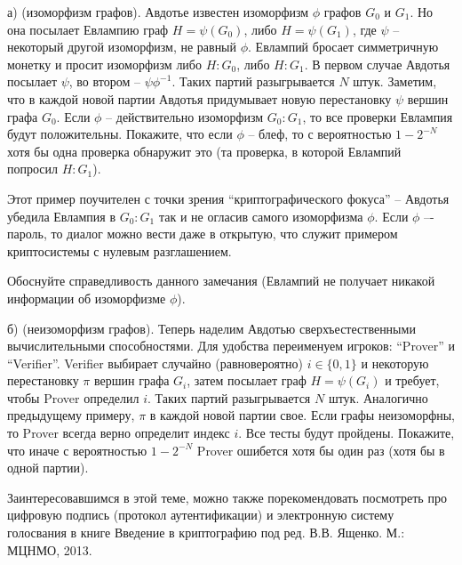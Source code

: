 \begin{problem} 

а) (изоморфизм графов). Авдотье известен изоморфизм $\phi$ графов $G_0$ и $G_1$. Но она посылает Евлампию граф $H =\psi(G_0)$, либо $H =\psi(G_1)$, где $\psi$ -- некоторый другой изоморфизм, не равный $\phi$. Евлампий бросает симметричную монетку и просит изоморфизм либо $H : G_0$, либо $H : G_1$. В первом случае Авдотья  посылает  $\psi$, во втором -- $\psi \phi^{-1}$. Таких партий разыгрывается $N$ штук. Заметим, что в каждой новой партии Авдотья придумывает новую перестановку $\psi$   вершин графа $G_0$. Если $\phi$  -- действительно изоморфизм $G_0 : G_1$, то все проверки Евлампия будут положительны.
Покажите, что если $\phi$ -- блеф, то с вероятностью  $1 - 2^{-N}$  хотя бы одна проверка обнаружит это (та проверка, в которой Евлампий попросил $H : G_1$).

\begin{remark}
Этот пример поучителен с точки зрения ``криптографического фокуса'' -- Авдотья  убедила Евлампия в $G_0 : G_1$ так и не огласив самого изоморфизма $\phi$. Если $\phi$ –- пароль, то диалог можно вести даже в открытую, что служит примером криптосистемы с нулевым разглашением.
\end{remark}

Обоснуйте справедливость данного замечания (Евлампий не получает никакой информации об изоморфизме $\phi$).

б) (неизоморфизм графов). Теперь наделим Авдотью сверхъестественными вычислительными способностями. Для удобства переименуем игроков: ``Prover'' и ``Verifier''. Verifier выбирает случайно (равновероятно) $ i \in \lbrace 0, 1 \rbrace$ и некоторую перестановку $\pi$ вершин графа $G_i$, затем посылает граф $H =\psi(G_i)$ и требует, чтобы Prover определил $i$. Таких партий разыгрывается $N$ штук. Аналогично предыдущему примеру, $\pi$ в каждой новой партии свое. Если графы неизоморфны, то Prover всегда верно определит индекс $i$. Все тесты будут пройдены. Покажите, что иначе с вероятностью $1-2^{-N}$  Prover ошибется хотя бы один раз (хотя бы в одной партии).
 
 \begin{remark}
Заинтересовавшимся в этой теме, можно также порекомендовать посмотреть про цифровую подпись (протокол аутентификации) и электронную систему голосвания в книге Введение в криптографию под ред. В.В. Ященко. М.: МЦНМО, 2013.
\end{remark}
\end{problem}


